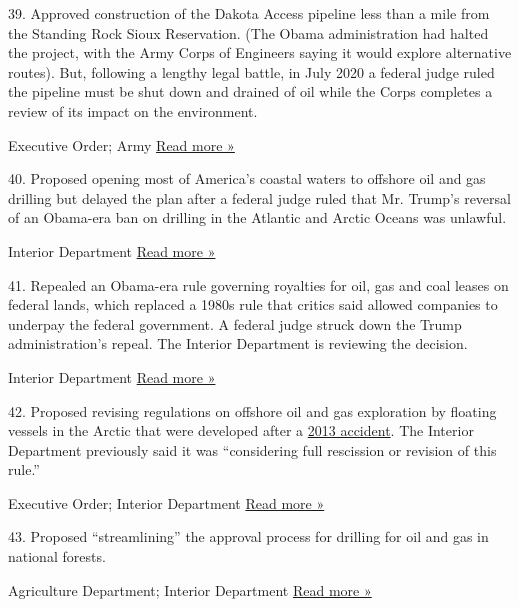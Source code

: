 39. Approved construction of the Dakota Access pipeline less than a mile
from the Standing Rock Sioux Reservation. (The Obama administration had
halted the project, with the Army Corps of Engineers saying it would
explore alternative routes). But, following a lengthy legal battle, in
July 2020 a federal judge ruled the pipeline must be shut down and
drained of oil while the Corps completes a review of its impact on the
environment.

 Executive Order; Army \textbar{}
\href{https://www.nytimes3xbfgragh.onion/2020/07/06/us/dakota-access-pipeline.html}{Read
more »}

40. Proposed opening most of America's coastal waters to offshore oil
and gas drilling but delayed the plan after a federal judge ruled that
Mr. Trump's reversal of an Obama-era ban on drilling in the Atlantic and
Arctic Oceans was unlawful.

 Interior Department \textbar{}
\href{https://www.nytimes3xbfgragh.onion/2019/04/25/climate/offshore-drilling-delay.html}{Read
more »}

41. Repealed an Obama-era rule governing royalties for oil, gas and coal
leases on federal lands, which replaced a 1980s rule that critics said
allowed companies to underpay the federal government. A federal judge
struck down the Trump administration's repeal. The Interior Department
is reviewing the decision.

 Interior Department \textbar{}
\href{https://www.reuters.com/article/us-usa-interior-royalties/federal-court-dismisses-trump-administrations-repeal-of-coal-oil-valuation-rule-idUSKCN1RR1K1}{Read
more »}

42. Proposed revising regulations on offshore oil and gas exploration by
floating vessels in the Arctic that were developed after a
\href{http://www.nytimes3xbfgragh.onion/2013/01/02/business/energy-environment/breakaway-oil-rig-runs-aground-in-gulf-of-alaska.html}{2013
accident}. The Interior Department previously said it was ``considering
full rescission or revision of this rule.''

 Executive Order; Interior Department \textbar{}
\href{https://www.reginfo.gov/public/do/eAgendaViewRule?pubId=201910\&RIN=1082-AA01}{Read
more »}

43. Proposed ``streamlining'' the approval process for drilling for oil
and gas in national forests.

 Agriculture Department; Interior Department \textbar{}
\href{https://www.outsideonline.com/2373896/trump-wants-speed-drilling-national-forests}{Read
more »}

